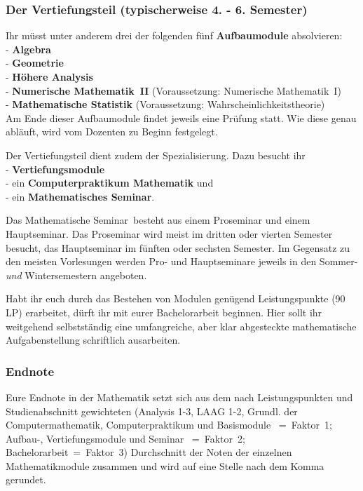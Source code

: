 \newpage
\subsubsection{Der Vertiefungsteil (typischerweise 4. - 6. Semester)}

Ihr müsst unter anderem
drei der folgenden fünf {\bf Aufbaumodule} absolvieren:\\[6pt]
- {\bf Algebra}\\[2pt]
- {\bf Geometrie}\\[2pt]
- {\bf Höhere Analysis}\\[2pt]
- {\bf Numerische Mathematik~II} (Voraussetzung: Numerische Mathematik~I)\\[2pt]
- {\bf Mathematische Statistik} (Voraussetzung: Wahrscheinlichkeitstheorie)\\[6pt]
Am Ende dieser Aufbaumodule findet jeweils eine Prüfung statt.
Wie diese genau abläuft, wird vom Dozenten zu Beginn festgelegt. 

Der Vertiefungsteil dient zudem der Spezialisierung.
Dazu besucht ihr\\
  - {\bf Vertiefungsmodule}\\
  - ein {\bf Computerpraktikum Mathematik} und\\
  - ein {\bf Mathematisches Seminar}.

Das \glqq Mathematische Seminar\grqq\ 
besteht aus einem Proseminar und einem Hauptseminar.
Das Proseminar wird meist im dritten oder vierten Semester besucht,
das Hauptseminar im fünften oder sechsten Semester.
Im Gegensatz zu den meisten Vorlesungen
werden Pro- und Hauptseminare jeweils
in den Sommer- {\it und} Wintersemestern angeboten.

Habt ihr euch durch das Bestehen von Modulen
genügend Leistungspunkte (90 LP) erarbeitet,
dürft ihr mit eurer Bachelorarbeit beginnen.
Hier sollt ihr weitgehend selbstständig
eine umfangreiche, aber klar abgesteckte
mathematische Aufgabenstellung schriftlich ausarbeiten.

\subsubsection{Endnote}

Eure Endnote in der Mathematik
setzt sich aus dem nach Leistungspunkten
und Studienabschnitt gewichteten (Analysis 1-3, LAAG 1-2,
Grundl. der Computermathematik, Computerpraktikum und Basismodule ~=~Faktor~1; \\
Aufbau-, Vertiefungsmodule und Seminar ~=~Faktor~2; Bachelorarbeit~=~Faktor~3)
Durchschnitt der Noten der einzelnen Mathematikmodule zusammen
und wird auf eine Stelle nach dem Komma gerundet.

